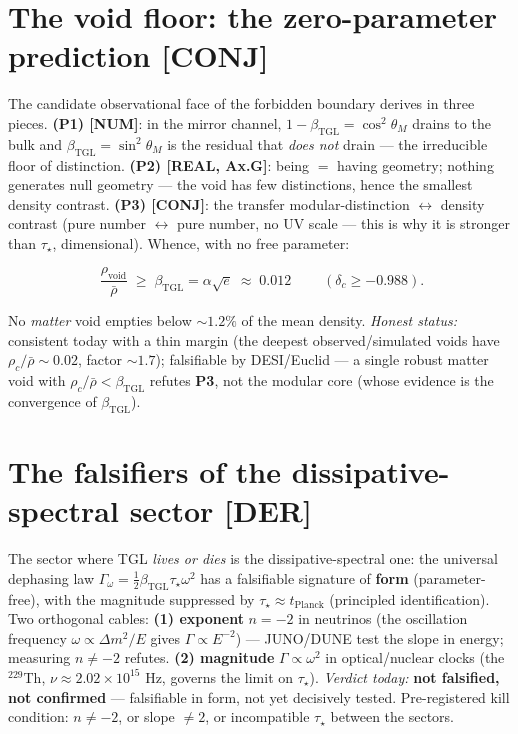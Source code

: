 \documentclass[11pt]{article}
\newcommand{\bTGL}{\beta_{\mathrm{TGL}}}\newcommand{\Msun}{M_{\odot}}\newcommand{\TGL}{\mathrm{TGL}}
\theoremstyle{definition}\newtheorem{deriv}{Derivation}
\begin{document}
\section{The void floor: the zero-parameter prediction \textsf{[CONJ]}}

The candidate observational face of the forbidden boundary derives in three pieces. \textbf{(P1) \textsf{[NUM]}}: in the mirror channel, $1-\bTGL=\cos^2\theta_M$ drains to the bulk and $\bTGL=\sin^2\theta_M$ is the residual that \emph{does not} drain --- the irreducible floor of distinction. \textbf{(P2) \textsf{[REAL, Ax.G]}}: being $=$ having geometry; nothing generates null geometry --- the void has few distinctions, hence the smallest density contrast. \textbf{(P3) \textsf{[CONJ]}}: the transfer modular-distinction $\leftrightarrow$ density contrast (pure number $\leftrightarrow$ pure number, no UV scale --- this is why it is stronger than $\tau_\star$, dimensional). Whence, with no free parameter:

\begin{equation}\boxed{\;\frac{\rho_{\mathrm{void}}}{\bar\rho}\;\geq\;\bTGL=\alpha\sqrt{e}\;\approx\;0.012\;}\qquad(\delta_c\geq-0.988).\end{equation}

No \emph{matter} void empties below $\sim1.2\%$ of the mean density. \emph{Honest status:} consistent today with a thin margin (the deepest observed/simulated voids have $\rho_c/\bar\rho\sim0.02$, factor $\sim1.7$); falsifiable by DESI/Euclid --- a single robust matter void with $\rho_c/\bar\rho<\bTGL$ refutes \textbf{P3}, not the modular core (whose evidence is the convergence of $\bTGL$).

\section{The falsifiers of the dissipative-spectral sector \textsf{[DER]}}

The sector where TGL \emph{lives or dies} is the dissipative-spectral one: the universal dephasing law $\Gamma_\omega=\tfrac12\bTGL\tau_\star\omega^2$ has a falsifiable signature of \textbf{form} (parameter-free), with the magnitude suppressed by $\tau_\star\approx t_{\mathrm{Planck}}$ (principled identification). Two orthogonal cables: \textbf{(1) exponent} $n=-2$ in neutrinos (the oscillation frequency $\omega\propto\Delta m^2/E$ gives $\Gamma\propto E^{-2}$) --- JUNO/DUNE test the slope in energy; measuring $n\neq-2$ refutes. \textbf{(2) magnitude} $\Gamma\propto\omega^2$ in optical/nuclear clocks (the $^{229}$Th, $\nu\approx2.02\times10^{15}$ Hz, governs the limit on $\tau_\star$). \emph{Verdict today:} \textbf{not falsified, not confirmed} --- falsifiable in form, not yet decisively tested. Pre-registered kill condition: $n\neq-2$, or slope $\neq2$, or incompatible $\tau_\star$ between the sectors.
\end{document}
